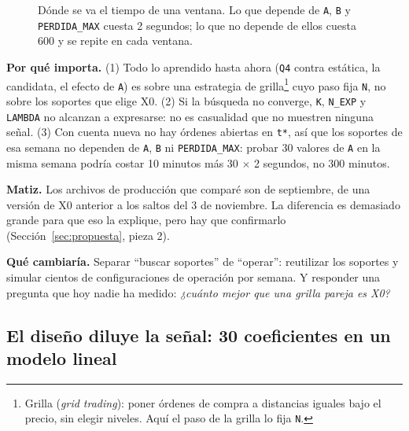 \documentclass[11pt,a4paper]{article}
\newcommand{\code}[1]{\texttt{\small #1}}
\begin{document}
\begin{figure}[h]
\centering
{}
\caption{Dónde se va el tiempo de una ventana. Lo que depende de \code{A}, \code{B} y
\code{PERDIDA\_MAX} cuesta 2 segundos; lo que no depende de ellos cuesta 600 y se repite en cada ventana.}
\label{fig:computo}
\end{figure}

\textbf{Por qué importa.} (1) Todo lo aprendido hasta ahora (\code{Q4} contra estática, la candidata, el
efecto de \code{A}) es sobre una estrategia de grilla\footnote{Grilla (\emph{grid trading}): poner órdenes
de compra a distancias iguales bajo el precio, sin elegir niveles. Aquí el paso de la grilla lo fija
\code{N}.} cuyo paso fija \code{N}, no sobre los soportes que elige X0. (2) Si la búsqueda no converge,
\code{K}, \code{N\_EXP} y \code{LAMBDA} no alcanzan a expresarse: no es casualidad que no muestren ninguna
señal. (3) Con cuenta nueva no hay órdenes abiertas en \code{t*}, así que los soportes de esa semana no
dependen de \code{A}, \code{B} ni \code{PERDIDA\_MAX}: probar 30 valores de \code{A} en la misma semana
podría costar 10 minutos más 30 $\times$ 2 segundos, no 300 minutos.

\textbf{Matiz.} Los archivos de producción que comparé son de septiembre, de una versión de X0 anterior a
los saltos del 3 de noviembre. La diferencia es demasiado grande para que eso la explique, pero hay que
confirmarlo (Sección~\ref{sec:propuesta}, pieza 2).

\textbf{Qué cambiaría.} Separar ``buscar soportes'' de ``operar'': reutilizar los soportes y simular cientos
de configuraciones de operación por semana. Y responder una pregunta que hoy nadie ha medido:
\emph{¿cuánto mejor que una grilla pareja es X0?}

\subsection{El diseño diluye la señal: 30 coeficientes en un modelo lineal}
\label{sec:ruido}
\end{document}
